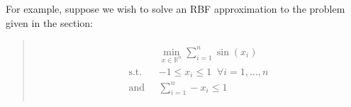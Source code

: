 \documentclass[letterpaper,11pt,openany,oneside]{sphinxmanual}
\begin{document}
For example, suppose we wish to solve an RBF approximation to the problem given in the {\hyperref[userguide:example\string-of\string-use]{}} section:
\begin{quote}
\begin{align*}\begin{aligned}
\begin{split}&\min_{x \in \mathbb{R}^n} \sum_{i=1}^n \sin(x_i) \\
\text{s.t. } \; &-1 \le x_i \le 1 \; \; \forall i=1,\dotsc,n \\
\text{and }  \; &\sum_{i=1}^n -x_i \le 1\end{split}\end{aligned}\end{align*}\end{quote}
\end{document}
